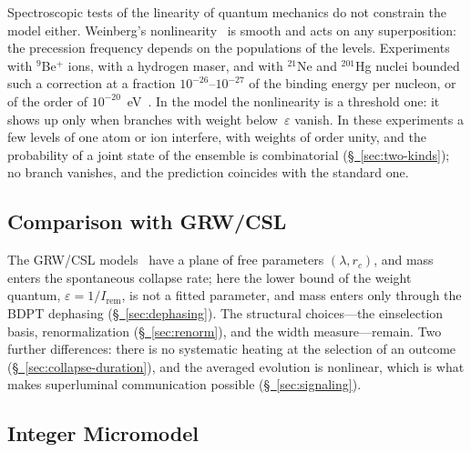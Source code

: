 \documentclass[11pt,a4paper]{article}
\newcommand{\Ost}{I_{\mathrm{rem}}}
\begin{document}
Spectroscopic tests of the linearity of quantum mechanics do not constrain the model either. Weinberg's nonlinearity~\cite{weinberg1989} is smooth and acts on any superposition: the precession frequency depends on the populations of the levels. Experiments with $^{9}$Be$^{+}$ ions, with a hydrogen maser, and with $^{21}$Ne and $^{201}$Hg nuclei bounded such a correction at a fraction $10^{-26}$--$10^{-27}$ of the binding energy per nucleon, or of the order of $10^{-20}$~eV~\cite{bollinger1989,walsworth1990,chupp1990,majumder1990}. In the model the nonlinearity is a threshold one: it shows up only when branches with weight below~$\varepsilon$ vanish. In these experiments a few levels of one atom or ion interfere, with weights of order unity, and the probability of a joint state of the ensemble is combinatorial (\hyperref[sec:two-kinds]{\S~\ref*{sec:two-kinds}}); no branch vanishes, and the prediction coincides with the standard one.

\subsection{Comparison with GRW/CSL}

The GRW/CSL models~\cite{ghirardi1986,ghirardi1990,bassi2013} have a plane of free parameters $(\lambda,r_c)$, and mass enters the spontaneous collapse rate; here the lower bound of the weight quantum, $\varepsilon=1/\Ost$, is not a fitted parameter, and mass enters only through the BDPT dephasing (\hyperref[sec:dephasing]{\S~\ref*{sec:dephasing}}). The structural choices---the einselection basis, renormalization (\hyperref[sec:renorm]{\S~\ref*{sec:renorm}}), and the width measure---remain. Two further differences: there is no systematic heating at the selection of an outcome (\hyperref[sec:collapse-duration]{\S~\ref*{sec:collapse-duration}}), and the averaged evolution is nonlinear, which is what makes superluminal communication possible (\hyperref[sec:signaling]{\S~\ref*{sec:signaling}}).

\subsection{Integer Micromodel}
\label{sec:micromodel}
\end{document}
